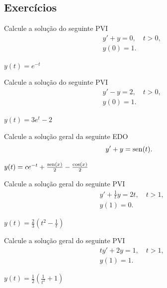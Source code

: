 \subsection*{Exercícios}

\begin{exer}
  Calcule a solução do seguinte PVI
  \begin{align}
    &y' + y = 0, \quad t>0, \\
    &y(0) = 1.    
  \end{align}
\end{exer}
\begin{resp}
  $y(t) = e^{-t}$
\end{resp}

\begin{exer}
  Calcule a solução do seguinte PVI
  \begin{align}
    &y' - y = 2, \quad t>0, \\
    &y(0) = 1.    
  \end{align}
\end{exer}
\begin{resp}
  $y(t) = 3e^{t}-2$
\end{resp}

\begin{exer}
  Calcule a solução geral da seguinte EDO
  \begin{equation}
    y' + y = \operatorname{sen}(t).
  \end{equation}
\end{exer}
\begin{resp}
  $y(t) = ce^{-t} + \frac{\operatorname{sen}(x)}{2} - \frac{\cos(x)}{2}$
\end{resp}

\begin{exer}
  Calcule a solução geral do seguinte PVI
  \begin{align}
    &y' + \frac{1}{t}y = 2t,\quad t>1,\\
    &y(1) = 0.
  \end{align}
\end{exer}
\begin{resp}
  $y(t) = \frac{2}{3}\left(t^2 - \frac{1}{t}\right)$
\end{resp}

\begin{exer}
  Calcule a solução geral do seguinte PVI
  \begin{align}
    &ty' + 2y = 1,\quad t>1,\\
    &y(1) = 1.
  \end{align}
\end{exer}
\begin{resp}
  $y(t) = \frac{1}{2}\left(\frac{1}{t^2} + 1\right)$
\end{resp}

